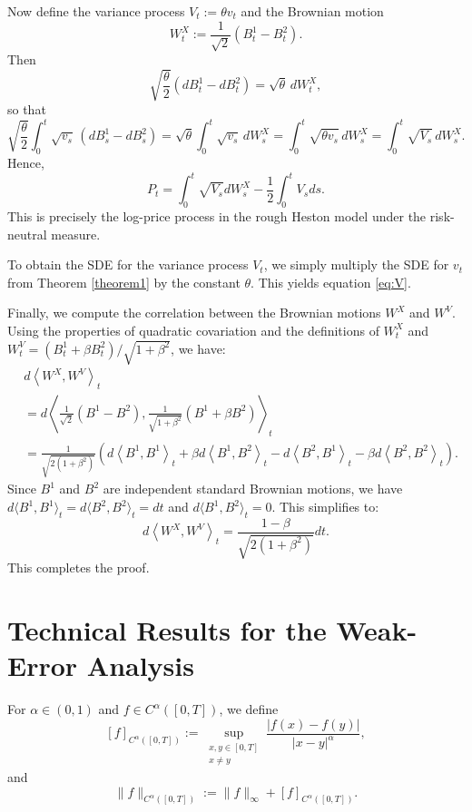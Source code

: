 \documentclass[letterpaper]{article}
\numberwithin{equation}{section}
\theoremstyle{definition}
\theoremstyle{remark}
\begin{document}
Now define the variance process $V_t:=\theta v_t$ and the Brownian motion
\[
  W_t^X:=\frac{1}{\sqrt{2}}(B_t^1-B_t^2).
\]
Then
\[
  \sqrt{\frac{\theta}{2}}\left(dB_t^1-dB_t^2\right)=\sqrt{\theta}\,dW_t^X,
\]
so that
\[
  \sqrt{\frac{\theta}{2}}\int_0^t \sqrt{v_s}\,(dB_s^1-dB_s^2)
  =\sqrt{\theta}\int_0^t \sqrt{v_s}\,dW_s^X
  =\int_0^t \sqrt{\theta v_s}\,dW_s^X
  =\int_0^t \sqrt{V_s}\,dW_s^X.
\]
Hence,
\[
  P_t = \int_0^t \sqrt{V_s} dW_s^X - \frac{1}{2} \int_0^t V_s ds.
\]
This is precisely the log-price process in the rough Heston model under the risk-neutral measure.

To obtain the SDE for the variance process $V_t$, we simply multiply the SDE for $v_t$ from Theorem \ref{theorem1} by the constant $\theta$. This yields equation \eqref{eq:V}.

Finally, we compute the correlation between the Brownian motions $W^X$ and $W^V$. Using the properties of quadratic covariation and the definitions of $W_t^X$ and $W_t^V = (B_t^1 + \beta B_t^2) / \sqrt{1+\beta^2}$, we have:
\begin{align*}
  &d\left\langle W^X, W^V \right\rangle_t 
  \\
  &= d\left\langle \frac{1}{\sqrt{2}}\left(B^1 - B^2\right), \frac{1}{\sqrt{1+\beta^2}}\left(B^1 + \beta B^2\right) \right\rangle_t \\
  &= \frac{1}{\sqrt{2(1+\beta^2)}} \left( d\left\langle B^1, B^1 \right\rangle_t + \beta d\left\langle B^1, B^2 \right\rangle_t - d\left\langle B^2, B^1 \right\rangle_t - \beta d\left\langle B^2, B^2 \right\rangle_t \right).
\end{align*}
Since $B^1$ and $B^2$ are independent standard Brownian motions, we have $d\langle B^1, B^1 \rangle_t = d\langle B^2, B^2 \rangle_t = dt$ and $d\langle B^1, B^2 \rangle_t = 0$. This simplifies to:
\[
    d\left\langle W^X,W^V \right\rangle_t=\frac{1-\beta}{\sqrt{2(1+\beta^2)}}dt.
\]
This completes the proof.


\section{Technical Results for the Weak-Error Analysis}
\label{supp:weak-error-proofs}

For $\alpha\in(0,1)$ and $f\in C^\alpha([0,T])$, we define
\begin{equation}\label{eq:holder-seminorm}
  [f]_{C^\alpha([0,T])}
  :=
  \sup_{\substack{x,y\in[0,T]\\x\neq y}}
  \frac{|f(x)-f(y)|}{|x-y|^\alpha},
\end{equation}
and
\begin{equation}\label{eq:holder-norm}
  \|f\|_{C^\alpha([0,T])}
  :=
  \|f\|_\infty+[f]_{C^\alpha([0,T])}.
\end{equation}
\end{document}

